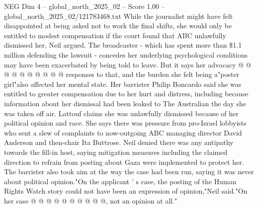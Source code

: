 \begin{textsample}{NEG Dim 4 – global\_north\_2025\_02 – Score 1.00 – global\_north\_2025\_02/121783468.txt}
While the journalist might have felt disappointed at being asked not to work the final shifts, she would only be entitled to modest compensation if the court found that ABC unlawfully dismissed her, Neil argued.
The broadcaster - which has spent more than \$1.1 million defending the lawsuit - concedes her underlying psychological conditions may have been exacerbated by being told to leave.
But it says her advocacy @ @ @ @ @ @ @ @ @ @ responses to that, and the burden she felt being a"poster girl"also affected her mental state.
Her barrister Philip Boncardo said she was entitled to greater compensation due to her hurt and distress, including because information about her dismissal had been leaked to The Australian the day she was taken off air.
Lattouf claims she was unlawfully dismissed because of her political opinion and race.
She says there was pressure from pro-Israel lobbyists who sent a slew of complaints to now-outgoing ABC managing director David Anderson and then-chair Ita Buttrose.
Neil denied there was any antipathy towards the fill-in host, saying mitigation measures including the claimed direction to refrain from posting about Gaza were implemented to protect her.
The barrister also took aim at the way the case had been run, saying it was never about political opinion."On the applicant ' s case, the posting of the Human Rights Watch story could not have been an expression of opinion,"Neil said."On her case @ @ @ @ @ @ @ @ @ @, not an opinion at all."

\end{textsample}
